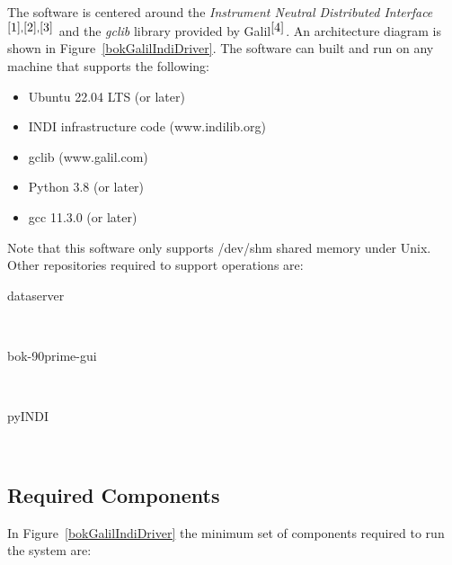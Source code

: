 \documentclass[12pt,twoside]{article}
\begin{document}
The software is centered around the \emph{Instrument Neutral Distributed Interface}$^{\cite{1}, \cite{2}, \cite{3}}$
and the \emph{gclib} library provided by Galil$^{\cite{4}}$. An architecture diagram is shown in Figure~\ref{bokGalilIndiDriver}.
The software can built and run on any machine that supports the following:

\begin{itemize}
\item Ubuntu 22.04 LTS (or later)
\item INDI infrastructure code (www.indilib.org)
\item gclib (www.galil.com)
\item Python 3.8 (or later)
\item gcc 11.3.0 (or later)
\end{itemize}

\noindent Note that this software only supports /dev/shm shared memory under Unix.
Other repositories required to support operations are:

\begin{description}
\item[dataserver]  \\
\item[bok-90prime-gui]  \\
\item[pyINDI]  \\
\end{description}

\subsection{Required Components}
\label{requiredcomponents}

In Figure~\ref{bokGalilIndiDriver} the minimum set of components required to run the system are:
\end{document}
